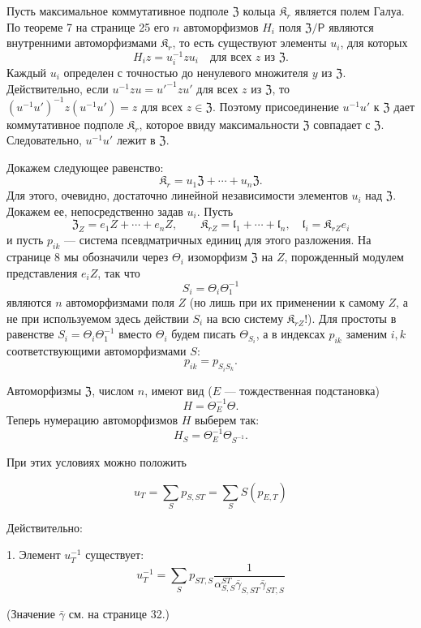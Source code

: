 \documentclass[11pt]{article}
\begin{document}
Пусть максимальное коммутативное подполе \(\mathfrak Z\) кольца \(\mathfrak K_r\) является полем Галуа. По теореме 7 на странице 25 его \(n\) автоморфизмов \(H_i\) поля \(\mathfrak Z/\mathsf P\) являются внутренними автоморфизмами \(\mathfrak K_r\), то есть существуют элементы \(u_i\), для которых
\[
H_i z=u_i^{-1}zu_i\quad\text{для всех }z\text{ из }\mathfrak Z.
\]
Каждый \(u_i\) определен с точностью до ненулевого множителя \(y\) из \(\mathfrak Z\). Действительно, если \(u^{-1}zu=u'^{-1}zu'\) для всех \(z\) из \(\mathfrak Z\), то \((u^{-1}u')^{-1}z(u^{-1}u')=z\) для всех \(z\in\mathfrak Z\). Поэтому присоединение \(u^{-1}u'\) к \(\mathfrak Z\) дает коммутативное подполе \(\mathfrak K_r\), которое ввиду максимальности \(\mathfrak Z\) совпадает с \(\mathfrak Z\). Следовательно, \(u^{-1}u'\) лежит в \(\mathfrak Z\).

Докажем следующее равенство:
\[
\mathfrak K_r=u_1\mathfrak Z+\cdots+u_n\mathfrak Z.
\]
Для этого, очевидно, достаточно линейной независимости элементов \(u_i\) над \(\mathfrak Z\). Докажем ее, непосредственно задав \(u_i\). Пусть
\[
\mathfrak Z_Z=e_1Z+\cdots+e_nZ,\qquad
\mathfrak K_{rZ}=\mathfrak l_1+\cdots+\mathfrak l_n,\quad
\mathfrak l_i=\mathfrak K_{rZ}e_i
\]
и пусть \(p_{ik}\) --- система псевдматричных единиц для этого разложения. На странице 8 мы обозначили через \(\Theta_i\) изоморфизм \(\mathfrak Z\) на \(Z\), порожденный модулем представления \(e_iZ\), так что
\[
S_i=\Theta_i\Theta_1^{-1}
\]
являются \(n\) автоморфизмами поля \(Z\) (но лишь при их применении к самому \(Z\), а не при используемом здесь действии \(S_i\) на всю систему \(\mathfrak K_{rZ}\)!). Для простоты в равенстве \(S_i=\Theta_i\Theta_1^{-1}\) вместо \(\Theta_i\) будем писать \(\Theta_{S_i}\), а в индексах \(p_{ik}\) заменим \(i,k\) соответствующими автоморфизмами \(S\):
\[
p_{ik}=p_{S_iS_k}.
\]

Автоморфизмы \(\mathfrak Z\), числом \(n\), имеют вид (\(E\) --- тождественная подстановка)
\[
H=\Theta_E^{-1}\Theta.
\]
Теперь нумерацию автоморфизмов \(H\) выберем так:
\[
H_S=\Theta_E^{-1}\Theta_{S^{-1}}.
\]

При этих условиях можно положить

\[
u_T=\sum_S p_{S,ST}=\sum_S S(p_{E,T})
\]

Действительно:

1. Элемент \(u_T^{-1}\) существует:
\[
u_T^{-1}=\sum_S p_{ST,S}
\frac{1}{\alpha_{S,S}^{ST}\overline{\gamma}_{S,ST}\overline{\gamma}_{ST,S}}
\]

(Значение \(\bar{\gamma}\) см. на странице 32.)
\end{document}

